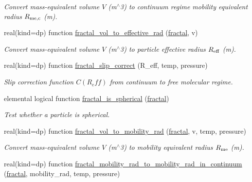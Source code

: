 \begin{DoxyCompactItemize}
\begin{DoxyCompactList}\small\item\em Convert mass-\/equivalent volume $V$ (m$^\wedge$3) to continuum regime mobility equivalent radius $R_{\rm me,c}$ (m). \end{DoxyCompactList}\item 
real(kind=dp) function \mbox{\hyperlink{namespacepmc__fractal_a28c425a25b9002db7a7dda6785da779e}{fractal\+\_\+vol\+\_\+to\+\_\+effective\+\_\+rad}} (\mbox{\hyperlink{fractal_8_f90_a949ba7f6f3ce672ed686152acedb28bf}{fractal}}, v)
\begin{DoxyCompactList}\small\item\em Convert mass-\/equivalent volume $V$ (m$^\wedge$3) to particle effective radius $R_{\rm eff}$ (m). \end{DoxyCompactList}\item 
real(kind=dp) function \mbox{\hyperlink{namespacepmc__fractal_a34d28805768741cc91334a5613acaf2a}{fractal\+\_\+slip\+\_\+correct}} (R\+\_\+eff, temp, pressure)
\begin{DoxyCompactList}\small\item\em Slip correction function $C(R_eff)$ from continuum to free molecular regime. \end{DoxyCompactList}\item 
elemental logical function \mbox{\hyperlink{namespacepmc__fractal_a4b772cc8c37c9773a9ff601e87dacd69}{fractal\+\_\+is\+\_\+spherical}} (\mbox{\hyperlink{fractal_8_f90_a949ba7f6f3ce672ed686152acedb28bf}{fractal}})
\begin{DoxyCompactList}\small\item\em Test whether a particle is spherical. \end{DoxyCompactList}\item 
real(kind=dp) function \mbox{\hyperlink{namespacepmc__fractal_a510e73608db705ea8d74c854dcbbd736}{fractal\+\_\+vol\+\_\+to\+\_\+mobility\+\_\+rad}} (\mbox{\hyperlink{fractal_8_f90_a949ba7f6f3ce672ed686152acedb28bf}{fractal}}, v, temp, pressure)
\begin{DoxyCompactList}\small\item\em Convert mass-\/equivalent volume $V$ (m$^\wedge$3) to mobility equivalent radius $R_{\rm me}$ (m). \end{DoxyCompactList}\item 
real(kind=dp) function \mbox{\hyperlink{namespacepmc__fractal_a7d5c0046bbe4c5d6c171d9dd287b73ca}{fractal\+\_\+mobility\+\_\+rad\+\_\+to\+\_\+mobility\+\_\+rad\+\_\+in\+\_\+continuum}} (\mbox{\hyperlink{fractal_8_f90_a949ba7f6f3ce672ed686152acedb28bf}{fractal}}, mobility\+\_\+rad, temp, pressure)

\end{DoxyCompactItemize}
